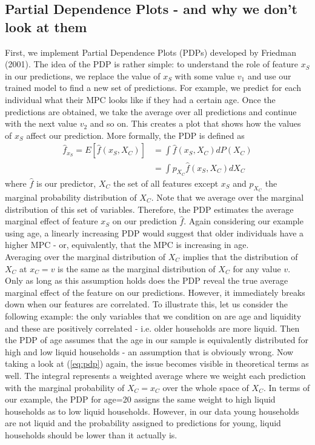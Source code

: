 \subsection{Partial Dependence Plots - and why we don't look at them}
First, we implement Partial Dependence Plots (PDPs) developed by Friedman (2001). The idea of the PDP is rather simple: to understand the role of feature $x_S$ in our predictions, we replace the value of $x_S$ with some value $v_1$ and use our trained model to find a new set of predictions. For example, we predict for each individual what their MPC looks like if they had a certain age. Once the predictions are obtained, we take the average over all predictions and continue with the next value $v_2$ and so on. This creates a plot that shows how the values of $x_S$ affect our prediction. More formally, the PDP is defined as
\begin{align}
    \hat{f}_{x_S}=E[\hat{f}(x_S, X_C)]&=\int\hat{f}(x_S, X_C)dP(X_C) \label{eq:pdp} \\
    &=\int p_{X_C} \hat{f}(x_S, X_C)dX_C
\end{align}
where $\hat{f}$ is our predictor, $X_C$ the set of all features except $x_S$ and $p_{X_C}$ the marginal probability distribution of $X_C$. Note that we average over the marginal distribution of this set of variables. Therefore, the PDP estimates the average marginal effect of feature $x_S$ on our prediction $\hat{f}$. Again considering our example using age, a linearly increasing PDP would suggest that older individuals have a higher MPC - or, equivalently, that the MPC is increasing in age. \\
Averaging over the marginal distribution of $X_C$ implies that the distribution of $X_C$ at $x_C=v$  is the same as the marginal distribution of $X_C$ for any value $v$. Only as long as this assumption holds does the PDP reveal the true average marginal effect of the feature on our predictions. However, it immediately breaks down when our features are correlated. To illustrate this, let us consider the following example: the only variables that we condition on are age and liquidity and these are positively correlated - i.e. older households are more liquid. Then the PDP of age assumes that the age in our sample is equivalently distributed for high and low liquid households - an assumption that is obviously wrong. Now taking a look at (\ref{eq:pdp}) again, the issue becomes visible in theoretical terms as well. The integral represents a weighted average where we weight each prediction with the marginal probability of $X_C=x_C$ over the whole space of $X_C$. In terms of our example, the PDP for age=20 assigns the same weight to high liquid households as to low liquid households. However, in our data young households are not liquid and the probability assigned to predictions for young, liquid households should be lower than it actually is. \\
